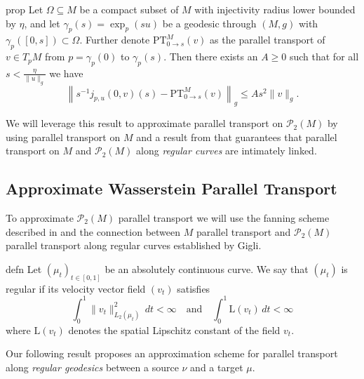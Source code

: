 \documentclass[11pt]{article}
\newcommand{\man}{M}
\begin{document}
\begin{restatable}{prop}{} \label{fanning approximation}
    Let $\Omega \subseteq \man$ be a compact subset of $\man$ with injectivity radius lower bounded by $\eta$, and let $\gamma_p(s) = \exp_p(su)$ be a geodesic through $(\man, g)$ with $\gamma_p([0, s]) \subset \Omega$. Further denote $\text{PT}_{0 \rightarrow s}^\man(v)$ as the parallel transport of $v \in T_{p}\man$ from $p = \gamma_p(0)$ to $\gamma_p(s)$. Then there exists an $A \geq 0$ such that for all $s < \frac{\eta}{\|u\|_g}$ we have   
    \[\left\|s^{-1}j_{p, u}(0, v)(s) - \text{PT}_{0 \rightarrow s}^\man(v)\right\|_g \leq As^2\|v\|_g. \]
\end{restatable}


We will leverage this result to approximate parallel transport on $\mathcal{P}_2(\man)$ by using parallel transport on $\man$ and a result from \citet{gigli2012second} that guarantees that parallel transport on $\man$ and $\mathcal{P}_2(\man)$ along \textit{regular curves} are intimately linked. 

\subsection{Approximate Wasserstein Parallel Transport}

To approximate $\mathcal{P}_2(\man)$ parallel transport we will use the fanning scheme described in  and the connection between $\man$ parallel transport and $\mathcal{P}_2(\man)$ parallel transport along regular curves established by Gigli.

\begin{restatable}{defn}{}
    Let $(\mu_t)_{t \in [0,1]}$ be an absolutely continuous curve. We say that $(\mu_t)$ is regular if its velocity vector field $(v_t)$ satisfies 
    \[\int_0^1\|v_t\|_{L_2(\mu_t)}^2\,dt < \infty \quad \text{and} \quad \int_0^1\text{L}(v_t)\,dt < \infty\]
    where $\text{L}(v_t)$ denotes the spatial Lipschitz constant of the field $v_t$. 
\end{restatable}

Our following result proposes an approximation scheme for parallel transport along \textit{regular geodesics} between a source $\nu$ and a target $\mu$.
\end{document}
